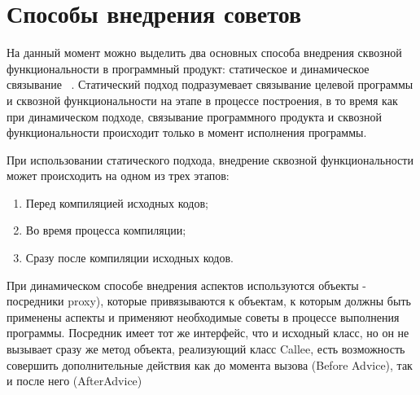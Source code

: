 \section{Способы внедрения советов}
На данный момент можно выделить два основных способа внедрения сквозной
функциональности в программный продукт: статическое и динамическое связывание~
\cite{static_and_dynamic_AOP}.
Статический подход подразумевает связывание целевой программы и сквозной
функциональности на этапе в процессе построения, в то время как при динамическом
подходе, связывание программного продукта и сквозной функциональности происходит
только в момент исполнения программы.

При использовании статического подхода, внедрение сквозной функциональности
может происходить на одном из трех этапов:
\begin{enumerate}
  \item Перед компиляцией исходных кодов;
  \item Во время процесса компиляции;
  \item Сразу после компиляции исходных кодов.
\end{enumerate}

При динамическом способе внедрения аспектов используются объекты - 
посредники proxy), которые привязываются к объектам, к которым должны быть 
применены аспекты и применяют необходимые советы в процессе выполнения 
программы.
Посредник имеет тот же интерфейс, что и исходный класс, но он не вызывает 
сразу же метод объекта, реализующий класс Callee, есть возможность 
совершить дополнительные действия как до момента вызова (Before Advice), 
так и после него (AfterAdvice)

